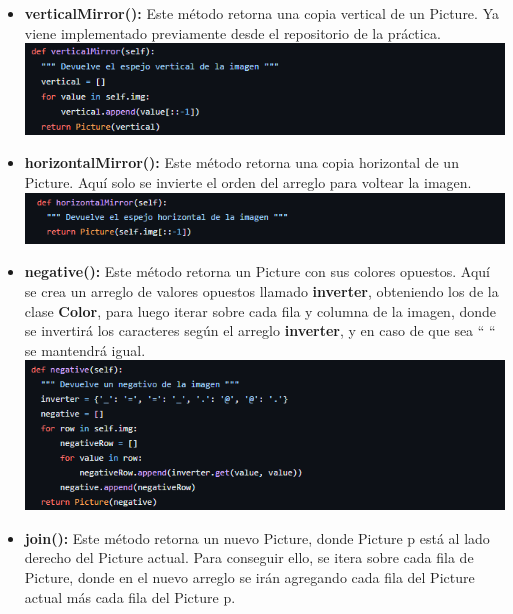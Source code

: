 \documentclass{article}
\begin{document}
\begin{itemize}
    \item \textbf{verticalMirror(): } Este método retorna una copia vertical de un Picture. Ya viene implementado previamente desde el repositorio de la práctica.\\



\includegraphics[width=\textwidth]{img/1.png}
\item \textbf{horizontalMirror(): } Este método retorna una copia horizontal de un Picture. Aquí solo se invierte el orden del arreglo para voltear la imagen.\\



\includegraphics[width=\textwidth]{img/2.png}
\item \textbf{negative(): } Este método retorna un Picture con sus colores opuestos. Aquí se crea un arreglo de valores opuestos llamado \textbf{inverter}, obteniendo los de la clase \textbf{Color}, para luego iterar sobre cada fila y columna de la imagen, donde se invertirá los caracteres según el arreglo \textbf{inverter}, y en caso de que sea “ “ se mantendrá igual.\\



\includegraphics[width=\textwidth]{img/3.png}
\item \textbf{join(): } Este método retorna un nuevo Picture, donde Picture p está al lado derecho del Picture actual. Para conseguir ello, se itera sobre cada fila de Picture, donde en el nuevo arreglo se irán agregando cada fila del Picture actual más cada fila del Picture p.\\




\end{itemize}
\end{document}
